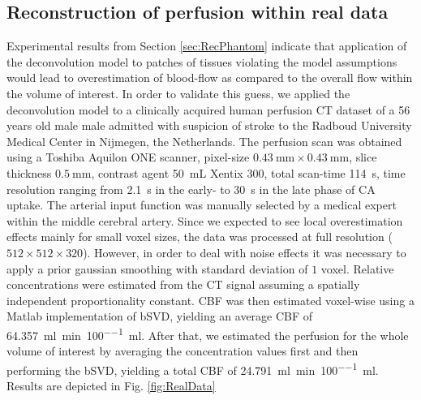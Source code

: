 \documentclass[journal,twocolumn]{IEEEtran}
\newcommand{\siPml}{\milli\litre\per\minute\per100\milli\litre}
\begin{document}
	\subsection{Reconstruction of perfusion within real data}\label{sec:RealData}
 	Experimental results from Section \ref{sec:RecPhantom} indicate that application of the deconvolution model to patches of tissues violating the model assumptions would lead to overestimation of blood-flow as compared to the overall flow within the volume of interest.
	In order to validate this guess, we applied the deconvolution model to a clinically acquired human perfusion CT dataset of a 56 years old male male admitted with suspicion of stroke to the Radboud University Medical Center in Nijmegen, the Netherlands.
	The perfusion scan was obtained using a Toshiba Aquilon ONE scanner, pixel-size $\SI{0.43}{\milli\meter}\times\SI{0.43}{\milli\meter}$, slice thickness $\SI{0.5}{\milli\meter}$, contrast agent \SI{50}{\milli\liter} Xentix 300, total scan-time \SI{114}{\second}, time resolution ranging from \SI{2.1}{\second} in the early- to \SI{30}{\second} in the late phase of CA uptake.
	The arterial input function was manually selected by a medical expert within the middle cerebral artery.
	Since we expected to see local overestimation effects mainly for small voxel sizes, the data was processed at full resolution ($512\times512\times320$). 
	However, in order to deal with noise effects it was necessary to apply a prior gaussian smoothing with standard deviation of $1$ voxel.	
	Relative concentrations were estimated from the CT signal assuming a spatially independent proportionality constant.
	CBF was then estimated voxel-wise using a Matlab implementation of bSVD, yielding an average CBF of \SI{64.357}{\siPml}.
	After that, we estimated the perfusion for the whole volume of interest by averaging the concentration values first and then performing the bSVD, yielding a total CBF of \SI{24.791}{\siPml}.
	Results are depicted in Fig. \ref{fig:RealData}
	
\end{document}
